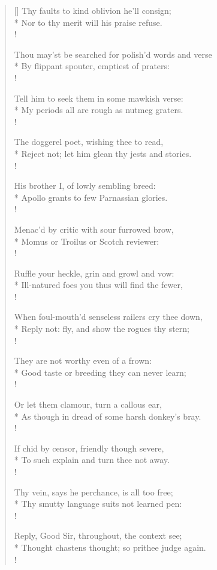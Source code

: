 \begin{verse}[\versewidth]
Thy faults to kind oblivion he'll consign;\\*
Nor to thy merit will his praise refuse.\\!

Thou may'st be searched for polish'd words and verse\\*
By flippant spouter, emptiest of praters:\\!

Tell him to seek them in some mawkish verse:\\*
My periods all are rough as nutmeg graters.\\!

The doggerel poet, wishing thee to read,\\*
Reject not; let him glean thy jests and stories.\\!

His brother I, of lowly sembling breed:\\*
Apollo grants to few Parnassian glories.\\!

Menac'd by critic with sour furrowed brow,\\*
Momus or Troilus or Scotch reviewer:\\!

Ruffle your heckle, grin and growl and vow:\\*
Ill-natured foes you thus will find the fewer,\\!

When foul-mouth'd senseless railers cry thee down,\\*
Reply not: fly, and show the rogues thy stern;\\!

They are not worthy even of a frown:\\*
Good taste or breeding they can never learn;\\!

Or let them clamour, turn a callous ear,\\*
As though in dread of some harsh donkey's bray.\\!

If chid by censor, friendly though severe,\\*
To such explain and turn thee not away.\\!

Thy vein, says he perchance, is all too free;\\*
Thy smutty language suits not learned pen:\\!

Reply, Good Sir, throughout, the context see;\\*
Thought chastens thought; so prithee judge again.\\!


\end{verse}
